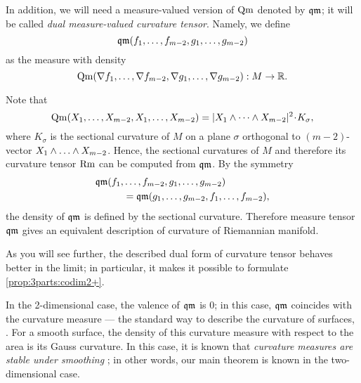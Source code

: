 In addition, we will need a measure-valued version of $\operatorname{\rm Qm}$ denoted by $\operatorname{\mathfrak{qm}}$;
it will be called \emph{dual measure-valued curvature tensor}.
Namely, we define 
\[\qm(f_1,\zz\dots,f_{m-2},g_1,\zz\dots,g_{m-2})\]
as the measure with density
\[\operatorname{\rm Qm}(\nabla f_1,\dots,\nabla f_{m-2},\nabla g_1,\dots,\nabla g_{m-2}): M\to\mathbb{R}.\]

Note that 
$$\Qm(X_1,\dots,X_{m-2},X_1,\dots,X_{m-2})
=
|X_1\wedge\dots \wedge X_{m-2}|^2\cdot K_\sigma, $$
where $K_\sigma$ is the sectional curvature of $M$ 
on a plane $\sigma$ orthogonal to $(m-2)$-vector
$X_1\wedge\zz\dots \wedge X_{m-2}$.
Hence, the sectional curvatures of $M$ and therefore its curvature tensor $\operatorname{\rm Rm}$ can  be computed from
$\operatorname{\mathfrak{qm}}$.
By the symmetry
\begin{align*}
\operatorname{\mathfrak{qm}}(f_1,&\dots,f_{m-2},g_1,\dots,g_{m-2})
\\
&=
\operatorname{\mathfrak{qm}}(g_1,\dots,g_{m-2},f_1,\dots,f_{m-2}),
\end{align*}
the density of $\operatorname{\mathfrak{qm}}$ is defined by the sectional curvature.
Therefore measure tensor $\operatorname{\mathfrak{qm}}$
gives an equivalent description of curvature of Riemannian manifold.

As you will see further, the described dual form of curvature tensor behaves better in the limit;
in particular, it makes it possible to formulate \ref{prop:3parts:codim2+}.

In the 2-dimensional case, the valence of $\operatorname{\mathfrak{qm}}$ is $0$;
in this case, $\operatorname{\mathfrak{qm}}$ coincides with the curvature measure --- the standard way to describe the curvature of surfaces, 
\cite{Resh,AZ}.
For a smooth surface, the density of this curvature measure with respect to the area
is its Gauss curvature.
In this case, it is known that \textit{curvature measures are stable under smoothing} \cite[VII \S13]{AZ};
in other words, our main theorem is known in the two-dimensional case.
